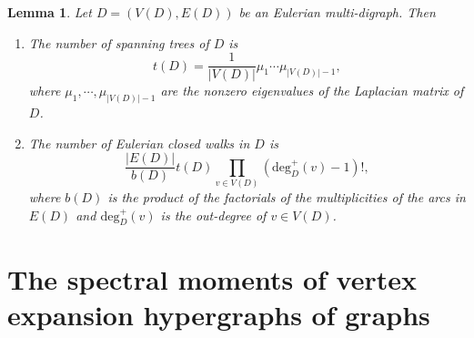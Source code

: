\documentclass{article}
\newtheorem{lem}[thm]{Lemma}
\begin{document}
\begin{lem}\cite{Farrell2016multi,Stanley1999enumerative}\label{yinli+}
Let $D=(V(D),E(D))$ be an Eulerian multi-digraph.
Then
\begin{enumerate}

\item[(a)]\citep[Corollary 5.6.6]{Stanley1999enumerative} The number of spanning trees of $D$ is $$t(D)=\frac{1}{|V(D)|}\mu_{1}\cdots\mu_{|V(D)|-1},$$
where $\mu_{1},\cdots,\mu_{|V(D)|-1}$ are the nonzero eigenvalues of the Laplacian matrix of $D$.

\item[(b)]\citep[Theorem 6]{Farrell2016multi} The number of Eulerian closed walks in $D$ is $$\frac{|E(D)|}{b(D)}t(D){\prod_{v\in V(D)}(\mathrm{deg}_{D}^{+}(v)-1)!},$$
where $b(D)$ is the product of the factorials of the multiplicities of the arcs in $E(D)$ and $\mathrm{deg}_{D}^{+}(v)$ is the out-degree of $v \in V(D)$.

\end{enumerate}
\end{lem}



\section{The spectral moments of vertex expansion hypergraphs of graphs}


%
\end{document}

